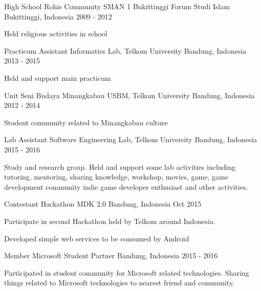 \begin{cventries}


\cventry
    {High School Rohis Community}
    {SMAN 1 Bukittinggi Forum Studi Islam}
    {Bukittinggi, Indonesia}
    {2009 - 2012}
    {
        \begin{cvitems}
            \item {Held religious activities in school}
        \end{cvitems}
    }


\cventry
    {Practicum Assistant}
    {Informatics Lab, Telkom University}
    {Bandung, Indonesia}
    {2013 - 2015}
    {
        \begin{cvitems}
            \item {Held and support main practicum}
        \end{cvitems}
    }


\cventry
    {Unit Seni Budaya Minangkabau}
    {USBM, Telkom University}
    {Bandung, Indonesia}
    {2012 - 2014}
    {
        \begin{cvitems}
            \item {Student community related to Minangkabau culture}
        \end{cvitems}
    }


\cventry
    {Lab Assistant}
    {Software Engineering Lab, Telkom University}
    {Bandung, Indonesia}
    {2015 - 2016}
    {
        \begin{cvitems}
            \item {Study and research group. Held and support some lab activities including tutoring, mentoring, sharing knowledge, workshop, movies, game, game development community indie game developer enthusiast and other activities.}
        \end{cvitems}
    }


\cventry
    {Contestant}
    {Hackathon MDK 2.0}
    {Bandung, Indonesia}
    {Oct 2015}
    {
        \begin{cvitems}
            \item {Participate in second Hackathon held by Telkom around Indonesia.}
            \item {Developed simple web services to be consumed by Android}
        \end{cvitems}
    }

    
\cventry
    {Member}
    {Microsoft Student Partner}
    {Bandung, Indonesia}
    {2015 - 2016}
    {
        \begin{cvitems}
            \item {Participated in student community for Microsoft related technologies. Sharing things 
            related to Microsoft technologies to nearest friend and community.}
        \end{cvitems}
    }
\end{cventries}
